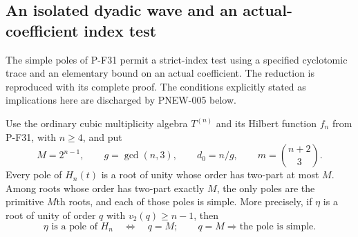 \subsection{An isolated dyadic wave and an actual-coefficient index test}

The simple poles of P-F31 permit a strict-index test using a specified
cyclotomic trace and an elementary bound on an actual coefficient.
The reduction is reproduced with its complete proof.  The conditions
explicitly stated as implications here are discharged by PNEW-005 below.

\begin{proposition}
\label{prop:cubicpairedwave}
Use the ordinary cubic multiplicity algebra $T^{(n)}$ and its
Hilbert function $f_n$ from P-F31, with $n\ge4$, and put
\[
 M=2^{n-1},\qquad g=\gcd(n,3),\qquad d_0=n/g,
 \qquad m=\binom{n+2}{3}.
\]
Every pole of $H_n(t)$ is a root of unity whose order has
two-part at most $M$. Among roots whose order has two-part exactly
$M$, the only poles are the primitive $M$th roots, and each of
those poles is simple. More precisely, if $\eta$ is a root of
unity of order $q$ with $v_2(q)\ge n-1$, then
\[
 \eta\text{ is a pole of }H_n
       \quad\Longleftrightarrow\quad q=M;
 \qquad q=M\Longrightarrow\text{the pole is simple}.
 \tag{P-F56a}
\]


\end{proposition}
